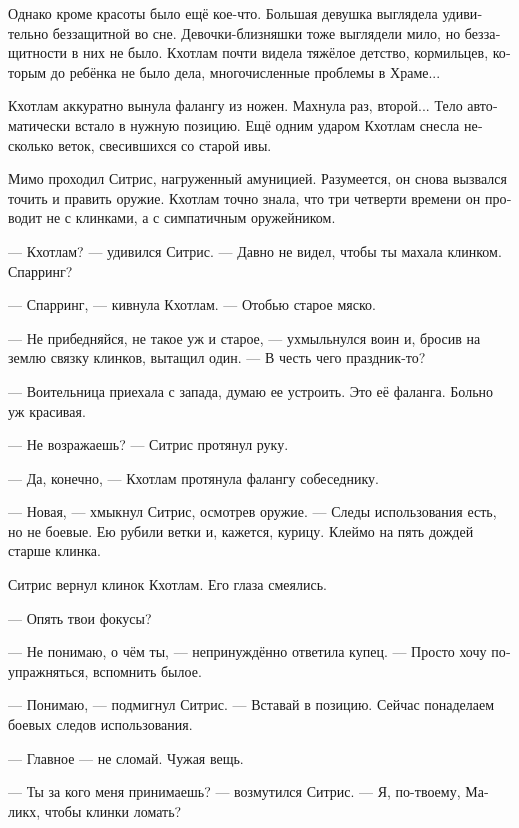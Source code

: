 \documentclass[a4paper,12pt,fleqn]{book}\usepackage{cooltooltips}\usepackage{polyglossia}\setdefaultlanguage[babelshorthands=true]{russian}\setotherlanguage{english}\defaultfontfeatures{Ligatures=TeX,Mapping=tex-text} \usepackage{xcolor}\definecolor{lightgray}{HTML}{bbbbbb}\color{lightgray}\newcommand{\ml}[3]{\textenglish{\textcolor{black}{#3}} }
\newcommand{\asterism}{\vspace{1em}{\centering\Large\bfseries$\ast~\ast~\ast$\par}\vspace{1em}}
\begin{document}
Однако кроме красоты было ещё кое-что.
Большая девушка выглядела удивительно беззащитной во сне.
Девочки-близняшки тоже выглядели мило, но беззащитности в них не было.
Кхотлам почти видела тяжёлое детство, кормильцев, которым до ребёнка не было дела, многочисленные проблемы в Храме...

\asterism

Кхотлам аккуратно вынула фалангу из ножен.
Махнула раз, второй...
Тело автоматически встало в нужную позицию.
Ещё одним ударом Кхотлам снесла несколько веток, свесившихся со старой ивы.

Мимо проходил Ситрис, нагруженный амуницией.
Разумеется, он снова вызвался точить и править оружие.
Кхотлам точно знала, что три четверти времени он проводит не с клинками, а с симпатичным оружейником.

--- Кхотлам? --- удивился Ситрис.
--- Давно не видел, чтобы ты махала клинком.
Спарринг?

--- Спарринг, — кивнула Кхотлам.
--- Отобью старое мяско.

--- Не прибедняйся, не такое уж и старое, --- ухмыльнулся воин и, бросив на землю связку клинков, вытащил один.
--- В честь чего праздник-то?

--- Воительница приехала с запада, думаю ее устроить.
Это её фаланга.
Больно уж красивая.

--- Не возражаешь? --- Ситрис протянул руку.

--- Да, конечно, --- Кхотлам протянула фалангу собеседнику.

--- Новая, --- хмыкнул Ситрис, осмотрев оружие.
--- Следы использования есть, но не боевые.
Ею рубили ветки и, кажется, курицу.
Клеймо на пять дождей старше клинка.

Ситрис вернул клинок Кхотлам.
Его глаза смеялись.

--- Опять твои фокусы?

--- Не понимаю, о чём ты, --- непринуждённо ответила купец.
--- Просто хочу поупражняться, вспомнить былое.

--- Понимаю, --- подмигнул Ситрис. 
--- Вставай в позицию.
Сейчас понаделаем боевых следов использования.

--- Главное --- не сломай.
Чужая вещь.

--- Ты за кого меня принимаешь? --- возмутился Ситрис.
--- Я, по-твоему, Маликх, чтобы клинки ломать?
\end{document}
